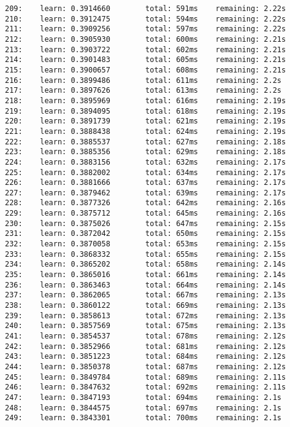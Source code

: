 \documentclass[11pt]{article}
\begin{document}
\begin{Verbatim}[commandchars=\\\{\}]
209:    learn: 0.3914660        total: 591ms    remaining: 2.22s
210:    learn: 0.3912475        total: 594ms    remaining: 2.22s
211:    learn: 0.3909256        total: 597ms    remaining: 2.22s
212:    learn: 0.3905930        total: 600ms    remaining: 2.21s
213:    learn: 0.3903722        total: 602ms    remaining: 2.21s
214:    learn: 0.3901483        total: 605ms    remaining: 2.21s
215:    learn: 0.3900657        total: 608ms    remaining: 2.21s
216:    learn: 0.3899486        total: 611ms    remaining: 2.2s
217:    learn: 0.3897626        total: 613ms    remaining: 2.2s
218:    learn: 0.3895969        total: 616ms    remaining: 2.19s
219:    learn: 0.3894095        total: 618ms    remaining: 2.19s
220:    learn: 0.3891739        total: 621ms    remaining: 2.19s
221:    learn: 0.3888438        total: 624ms    remaining: 2.19s
222:    learn: 0.3885537        total: 627ms    remaining: 2.18s
223:    learn: 0.3885356        total: 629ms    remaining: 2.18s
224:    learn: 0.3883156        total: 632ms    remaining: 2.17s
225:    learn: 0.3882002        total: 634ms    remaining: 2.17s
226:    learn: 0.3881666        total: 637ms    remaining: 2.17s
227:    learn: 0.3879462        total: 639ms    remaining: 2.17s
228:    learn: 0.3877326        total: 642ms    remaining: 2.16s
229:    learn: 0.3875712        total: 645ms    remaining: 2.16s
230:    learn: 0.3875026        total: 647ms    remaining: 2.15s
231:    learn: 0.3872042        total: 650ms    remaining: 2.15s
232:    learn: 0.3870058        total: 653ms    remaining: 2.15s
233:    learn: 0.3868332        total: 655ms    remaining: 2.15s
234:    learn: 0.3865202        total: 658ms    remaining: 2.14s
235:    learn: 0.3865016        total: 661ms    remaining: 2.14s
236:    learn: 0.3863463        total: 664ms    remaining: 2.14s
237:    learn: 0.3862065        total: 667ms    remaining: 2.13s
238:    learn: 0.3860122        total: 669ms    remaining: 2.13s
239:    learn: 0.3858613        total: 672ms    remaining: 2.13s
240:    learn: 0.3857569        total: 675ms    remaining: 2.13s
241:    learn: 0.3854537        total: 678ms    remaining: 2.12s
242:    learn: 0.3852966        total: 681ms    remaining: 2.12s
243:    learn: 0.3851223        total: 684ms    remaining: 2.12s
244:    learn: 0.3850378        total: 687ms    remaining: 2.12s
245:    learn: 0.3849784        total: 689ms    remaining: 2.11s
246:    learn: 0.3847632        total: 692ms    remaining: 2.11s
247:    learn: 0.3847193        total: 694ms    remaining: 2.1s
248:    learn: 0.3844575        total: 697ms    remaining: 2.1s
249:    learn: 0.3843301        total: 700ms    remaining: 2.1s

\end{Verbatim}
\end{document}
